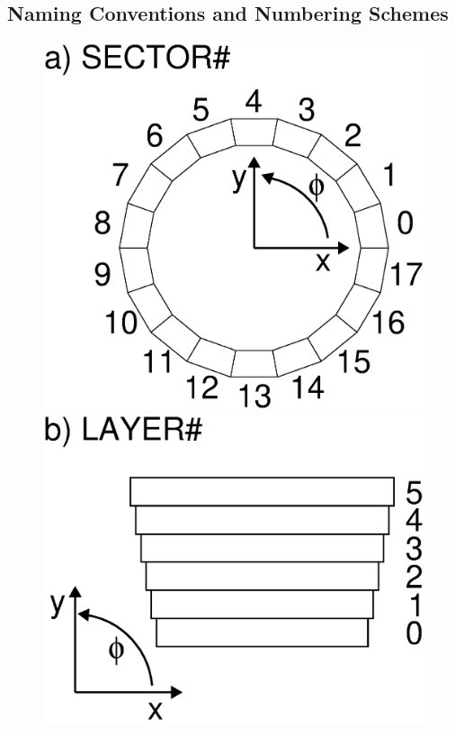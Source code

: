 \documentclass{alicetdr}
\begin{document}
\subsection{Naming Conventions and Numbering Schemes}
%
\begin{figure}[htb]
\begin{minipage}[b]{0.49\textwidth}
\begin{center}
\includegraphics[width=\textwidth]{plots/sector_numbering.eps}
\end{center}
\end{minipage}
\begin{minipage}[b]{0.49\textwidth}
\begin{center}
\includegraphics[width=\textwidth]{plots/layer_numbering.eps}

\end{center}
\end{minipage}
\end{figure}
\end{document}
